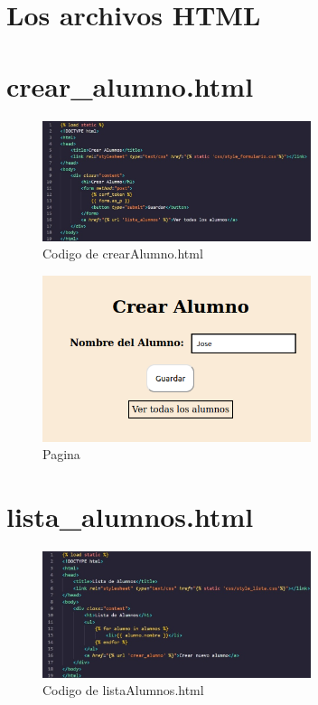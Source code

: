 \documentclass[10pt, a4paper]{article}
\begin{document}
\section{Los archivos HTML}

\section{crear\_alumno.html }
\begin{figure}[H]
  \centering
  \includegraphics[width=0.7\textwidth]{img/imagen7.jpeg}
  \caption{Codigo de crearAlumno.html}
\end{figure}  

\begin{figure}[H]
  \centering
  \includegraphics[width=0.7\textwidth]{img/CrearAlumno.png}
  \caption{Pagina}
\end{figure}

\section{lista\_alumnos.html }
\begin{figure}[H]
  \centering
  \includegraphics[width=0.7\textwidth]{img/imagen10.jpeg}
  \caption{Codigo de listaAlumnos.html}
\end{figure} 
\end{document}
